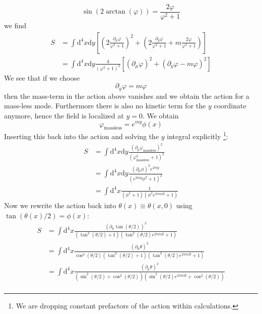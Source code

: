 \documentclass[master,       %
               twoside,        %
               BCOR10mm,       %
               english,ngerman, %
               ]{GAUBM}
\begin{document}
\begin{otherlanguage}{english}
\begin{equation}
	\sin(2 \arctan(\varphi)) = \frac{2 \varphi}{\varphi^2 + 1}
\end{equation}
we find
\begin{align}
    S &= \int \mathrm{d}^4 x \mathrm{d} y \left[
    \left(2 \frac{\partial_\mu \varphi}{\varphi^2 + 1} \right)^2 + 
    \left(2 \frac{\partial_y \varphi}{\varphi^2 + 1} + m \frac{2 \varphi}{\varphi^2 + 1} \right) \right] \nonumber \\
    &= \int \mathrm{d}^4 x \mathrm{d} y  \frac{4}{(\varphi^2 + 1)^2}
    \left[ (\partial_\mu \varphi)^2 + (\partial_y \varphi - m \varphi)^2 \right]
\end{align}
We see that if we choose 
\begin{equation}
	\partial_y \varphi = m \varphi
\end{equation}
then the mass-term in the action above vanishes and we obtain the action for a mass-less mode. Furthermore there is also no kinetic term for the $y$ coordinate anymore, hence the field is localized at $y = 0$.
We obtain
\begin{equation}
	\varphi_{\mathrm{massless}} = e^{my} \phi(x) 
\end{equation}
Inserting this back into the action and solving the $y$ integral explicitly \footnote{We are dropping constant prefactors of the action within calculations.}:
\begin{align}
	S &= \int \mathrm{d}^4 x \mathrm{d} y  \frac{(\partial_\mu \varphi_{\mathrm{massless}})^2}{(\varphi_{\mathrm{massless}}^2 + 1)^2} \nonumber \\
	&= \int \mathrm{d}^4 x \mathrm{d} y  \frac{(\partial_\mu \phi)^2 e^{2my}}{(e^{2my} \phi^2 + 1)^2} \nonumber \\
	&= \int \mathrm{d}^4 x\frac{1}{(\phi^2 + 1)(\phi^2 e^{2\pi m R} + 1)}
\end{align}
Now we rewrite the action back into $\theta(x) \equiv \theta(x, 0)$ using $\tan(\theta(x)/2) = \phi(x)$:
\begin{align}
	 S &= \int \mathrm{d}^4 x \frac{(\partial_\mu \tan(\theta / 2))^2}{(\tan^2(\theta / 2) + 1)(\tan^2(\theta / 2) e^{2\pi m R} + 1)} \nonumber \\
	 &= \int \mathrm{d}^4 x \frac{(\partial_\mu \theta)^2}{\cos^4(\theta/2)(\tan^2(\theta / 2) + 1)(\tan^2(\theta / 2) e^{2\pi m R} + 1)} \nonumber \\
	 &= \int \mathrm{d}^4 x \frac{(\partial_\mu \theta)^2}{(\sin^2(\theta / 2) + \cos^2(\theta/2))(\sin^2(\theta / 2) e^{2\pi m R} + \cos^2(\theta / 2))} \nonumber \\

\end{align}
\end{otherlanguage}
\end{document}
